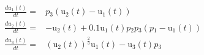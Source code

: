 \begin{align}
\frac{du{_1}(t)}{dt} =& p{_3} \left( \mathrm{u{_2}}\left( t \right) - \mathrm{u{_1}}\left( t \right) \right) \\
\frac{du{_2}(t)}{dt} =&  - \mathrm{u{_2}}\left( t \right) + 0.1 \mathrm{u{_1}}\left( t \right) p{_2} p{_3} \left( p{_1} - \mathrm{u{_1}}\left( t \right) \right) \\
\frac{du{_3}(t)}{dt} =& \left( \mathrm{u{_2}}\left( t \right) \right)^{\frac{2}{3}} \mathrm{u{_1}}\left( t \right) - \mathrm{u{_3}}\left( t \right) p{_3}
\end{align}
